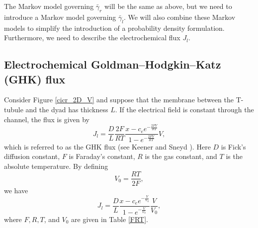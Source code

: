 The Markov model governing $\bar{\gamma}_{r}$ will be the same as above, but we need to 
introduce a Markov model governing $\bar{\gamma}_{l}$. We will also combine these Markov models
to simplify the introduction of a probability density formulation. Furthermore, we need to describe the electrochemical flux $J_{l}$.

\subsection{Electrochemical Goldman--Hodgkin--Katz (GHK) flux}

Consider Figure \ref{cicr_2D_V} and suppose that the membrane between the
T-tubule and the dyad has thickness $L.$ If the electrical field is
constant through the channel, the flux is given by%
\begin{equation}
J_{l}=\frac{D}{L}\frac{2F}{RT}\frac{x-c_{e}e^{-\frac{2FV}{RT}}}{1-e^{-\frac
{2FV}{RT}}}V, \label{GHK}
\end{equation}
which is referred to as the GHK flux (see Keener and Sneyd \cite{KeenerSneyd}). Here $D$ is
Fick's diffusion constant, $F$ is Faraday's constant, $R$ is the gas constant,
and $T$ is the absolute temperature.
By defining%
\[
V_0=\frac{RT}{2F},%
\]
we have%
\begin{equation}
J_{l}=\frac{D}{L}\frac{x-c_{e}e^{-\frac{V}{V_0}}}{1-e^{-\frac{V}{V_0}}}\frac{V}{V_0},\label{fluxJ}%
\end{equation}
where $F,R,T$, and $V_0$ are given in Table \ref{FRT}.


